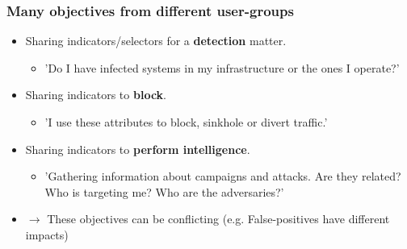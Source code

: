 
\begin{frame}
\frametitle{Many objectives from different user-groups}
        \begin{itemize}
                \item Sharing indicators/selectors for a {\bf detection} matter.
                        \begin{itemize}
                                \item 'Do I have infected systems in my infrastructure or the ones I operate?'
                        \end{itemize}
                \item Sharing indicators to {\bf block}.
                        \begin{itemize}
                                \item 'I use these attributes to block, sinkhole or divert traffic.'
                        \end{itemize}
                \item Sharing indicators to {\bf perform intelligence}.
                        \begin{itemize}
                                \item 'Gathering information about campaigns and attacks. Are they related? Who is targeting me? Who are the adversaries?'
                        \end{itemize}
                \item $\rightarrow$ These objectives can be conflicting (e.g. False-positives have different impacts)
        \end{itemize}
\end{frame}

